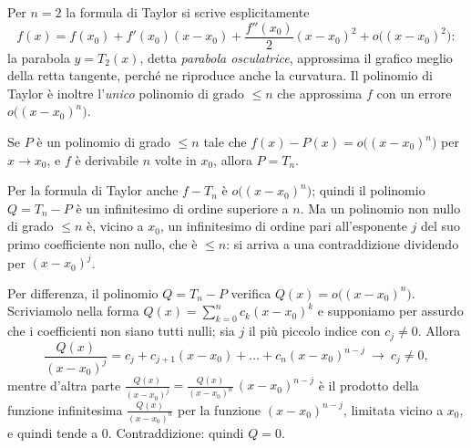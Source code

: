 Per $n=2$ la formula di Taylor si scrive esplicitamente
\begin{equation}\label{eq:taylor-ordine-2}
  f(x)=f(x_{0})+f'(x_{0})(x-x_{0})+\frac{f''(x_{0})}{2}(x-x_{0})^{2}+o\bigl((x-x_{0})^{2}\bigr):
\end{equation}
la parabola $y=T_{2}(x)$, detta \emph{parabola osculatrice}, approssima il grafico
meglio della retta tangente, perché ne riproduce anche la curvatura. Il polinomio di
Taylor è inoltre l'\emph{unico} polinomio di grado $\le n$ che approssima $f$ con un
errore $o\bigl((x-x_{0})^{n}\bigr)$.

\begin{proposizione}\label{prop:unicita-taylor}
Se $P$ è un polinomio di grado $\le n$ tale che $f(x)-P(x)=o\bigl((x-x_{0})^{n}\bigr)$
per $x\to x_{0}$, e $f$ è derivabile $n$ volte in $x_{0}$, allora $P=T_{n}$.
\end{proposizione}

\begin{schema}
\end{schema}

\begin{strategia}
Per la formula di Taylor anche $f-T_{n}$ è $o\bigl((x-x_{0})^{n}\bigr)$; quindi il polinomio
$Q=T_{n}-P$ è un infinitesimo di ordine superiore a $n$. Ma un polinomio non nullo di
grado $\le n$ è, vicino a $x_{0}$, un infinitesimo di ordine pari all'esponente $j$ del suo
primo coefficiente non nullo, che è $\le n$: si arriva a una contraddizione dividendo
per $(x-x_{0})^{j}$.
\end{strategia}

\begin{dimostrazione}
Per differenza, il polinomio $Q=T_{n}-P$ verifica $Q(x)=o\bigl((x-x_{0})^{n}\bigr)$.
Scriviamolo nella forma $Q(x)=\sum_{k=0}^{n}c_{k}(x-x_{0})^{k}$ e supponiamo per assurdo
che i coefficienti non siano tutti nulli; sia $j$ il più piccolo indice con
$c_{j}\neq0$. Allora
\[
  \frac{Q(x)}{(x-x_{0})^{j}}=c_{j}+c_{j+1}(x-x_{0})+\dots+c_{n}(x-x_{0})^{n-j}\ \to\ c_{j}\neq0,
\]
mentre d'altra parte
$\frac{Q(x)}{(x-x_{0})^{j}}=\frac{Q(x)}{(x-x_{0})^{n}}\,(x-x_{0})^{n-j}$ è il prodotto della
funzione infinitesima $\frac{Q(x)}{(x-x_{0})^{n}}$ per la funzione $(x-x_{0})^{n-j}$, limitata
vicino a $x_{0}$, e quindi tende a $0$. Contraddizione: quindi $Q=0$.
\end{dimostrazione}

